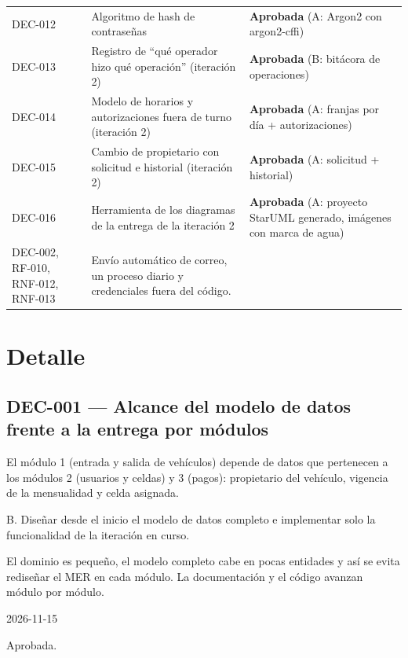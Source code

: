 \begin{longtable}{>{\raggedright\arraybackslash}p{1.8cm}>{\raggedright\arraybackslash}p{7.0cm}>{\raggedright\arraybackslash}p{5.6cm}}
DEC-012 & Algoritmo de hash de contraseñas & \textbf{Aprobada} (A: Argon2 con argon2-cffi)\\
DEC-013 & Registro de ``qué operador hizo qué operación'' (iteración 2) & \textbf{Aprobada} (B: bitácora de operaciones)\\
DEC-014 & Modelo de horarios y autorizaciones fuera de turno (iteración 2) & \textbf{Aprobada} (A: franjas por día + autorizaciones)\\
DEC-015 & Cambio de propietario con solicitud e historial (iteración 2) & \textbf{Aprobada} (A: solicitud + historial)\\
DEC-016 & Herramienta de los diagramas de la entrega de la iteración 2 & \textbf{Aprobada} (A: proyecto StarUML generado, imágenes con marca de agua)\\
DEC-002, RF-010, RNF-012, RNF-013 & Envío automático de correo, un proceso diario y credenciales fuera del código. & \\
\bottomrule
\end{longtable}

\section{Detalle}
\subsection{DEC-001 — Alcance del modelo de datos frente a la entrega por módulos}
\begin{description}[style=nextline]
  \item[Problema] El módulo 1 (entrada y salida de vehículos) depende de datos que pertenecen a los módulos 2 (usuarios y celdas) y 3 (pagos): propietario del vehículo, vigencia de la mensualidad y celda asignada.
  \item[Decisión seleccionada] B. Diseñar desde el inicio el modelo de datos completo e implementar solo la funcionalidad de la iteración en curso.
  \item[Justificación] El dominio es pequeño, el modelo completo cabe en pocas entidades y así se evita rediseñar el MER en cada módulo. La documentación y el código avanzan módulo por módulo.
  \item[Fecha] 2026-11-15
  \item[Estado] Aprobada.
\end{description}
